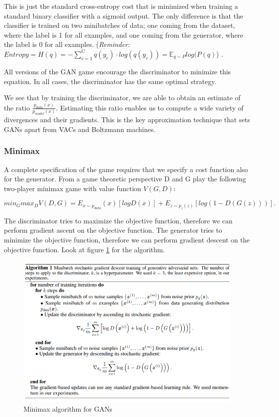 \documentclass{scrartcl}
\begin{document}
This is just the standard cross-entropy cost that is minimized when training
a standard binary classifier with a sigmoid output. The only difference is that the classifier is trained on two minibatches of data; one coming from the dataset, where the label is 1 for all examples, and one coming from the generator, where the label is 0 for all examples. (\textit{Reminder:} $Entropy = H(q) = - \sum_{c=1}^C q(y_c) \cdot log(q(y_c)) = \mathbb{E}_{q\sim{}P} log(P(q)$) \cite{demys-tds}.

All versions of the GAN game encourage the discriminator to minimize this equation. In all cases, the discriminator has the same optimal strategy.

We see that by training the discriminator, we are able to obtain an estimate of the ratio $\frac{p_{data}(x)}{p_{model}(x)}$. Estimating this ratio enables us to compute a wide variety of divergences and their gradients. This is the key approximation technique that sets GANs apart from VACs and Boltzmann machines.
\subsubsection{Minimax}
A complete specification of the game requires that we specify a cost function also for the generator. From a game theoretic perspective D and G play the following two-player minimax game with value function $V(G, D)$:

$$min_G max_D V (D, G) = E_{x\sim{}p_{data}}(x)[log D(x)] + E_{z\sim{}p_z(z)}[log(1 - D(G(z)))].$$

The discriminator tries to maximize the objective function, therefore we can perform gradient ascent on the objective function. The generator tries to minimize the objective function, therefore we can perform gradient descent on the objective function. Look at figure \ref{fig:gan_minmax} for the algorithm.

\begin{figure}
	\centering
		\includegraphics[scale=0.5]{img/gan_minmax}
	\caption{Minimax algorithm for GANs \cite{goodfellow2014generative}}
	\label{fig:gan_minmax}
\end{figure}
\end{document}
